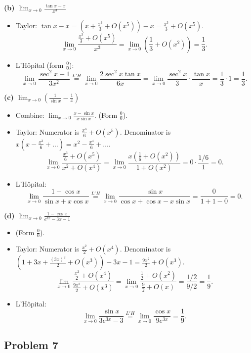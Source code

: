 \documentclass{article}
\begin{document}
\textbf{(b) \(\lim_{x\to 0} \frac{\tan x -x}{x^3}\)}
\begin{itemize}
    \item Taylor: \(\tan x - x = (x + \frac{x^3}{3} + O(x^5)) - x = \frac{x^3}{3} + O(x^5)\).
    \[ \lim_{x\to 0} \frac{\frac{x^3}{3} + O(x^5)}{x^3} = \lim_{x\to 0} (\frac{1}{3} + O(x^2)) = \frac{1}{3}. \]
    \item L'Hôpital (form \(\tfrac{0}{0}\)):
    \[ \lim_{x\to 0} \frac{\sec^2 x - 1}{3x^2} \overset{L'H}{=} \lim_{x\to 0} \frac{2\sec^2 x \tan x}{6x} = \lim_{x\to 0} \frac{\sec^2 x}{3} \cdot \frac{\tan x}{x} = \frac{1}{3} \cdot 1 = \frac{1}{3}. \]
\end{itemize}

\textbf{(c) \(\lim_{x\to 0} \left( \frac{1}{\sin x} - \frac{1}{x} \right)\)}
\begin{itemize}
    \item Combine: \(\lim_{x\to 0} \frac{x - \sin x}{x \sin x}\). (Form \(\tfrac{0}{0}\)).
    \item Taylor: Numerator is \(\frac{x^3}{6} + O(x^5)\). Denominator is \(x(x - \frac{x^3}{6} + \dots) = x^2 - \frac{x^4}{6} + \dots\).
    \[ \lim_{x\to 0} \frac{\frac{x^3}{6} + O(x^5)}{x^2 + O(x^4)} = \lim_{x\to 0} \frac{x(\frac{1}{6} + O(x^2))}{1 + O(x^2)} = 0 \cdot \frac{1/6}{1} = 0. \]
    \item L'Hôpital:
    \[ \lim_{x\to 0} \frac{1 - \cos x}{\sin x + x \cos x} \overset{L'H}{=} \lim_{x\to 0} \frac{\sin x}{\cos x + \cos x - x \sin x} = \frac{0}{1+1-0} = 0. \]
\end{itemize}

\textbf{(d) \(\lim_{x\to 0} \frac{1-\cos x}{e^{3x}-3x-1}\)}
\begin{itemize}
    \item (Form \(\tfrac{0}{0}\)).
    \item Taylor: Numerator is \(\frac{x^2}{2} + O(x^4)\). Denominator is \((1 + 3x + \frac{(3x)^2}{2} + O(x^3)) - 3x - 1 = \frac{9x^2}{2} + O(x^3)\).
    \[ \lim_{x\to 0} \frac{\frac{x^2}{2} + O(x^4)}{\frac{9x^2}{2} + O(x^3)} = \lim_{x\to 0} \frac{\frac{1}{2} + O(x^2)}{\frac{9}{2} + O(x)} = \frac{1/2}{9/2} = \frac{1}{9}. \]
    \item L'Hôpital:
    \[ \lim_{x\to 0} \frac{\sin x}{3e^{3x} - 3} \overset{L'H}{=} \lim_{x\to 0} \frac{\cos x}{9e^{3x}} = \frac{1}{9}. \]
\end{itemize}

\hrulefill

\subsection*{Problem 7}
\end{document}
